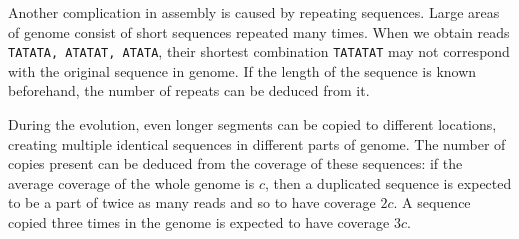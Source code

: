 \medskip

Another complication in assembly is caused by repeating sequences. Large areas of genome consist of short sequences repeated many times.
When we obtain reads \texttt{TATATA, ATATAT, ATATA}, their shortest combination \texttt{TATATAT} may not correspond with the original sequence in genome.
If the length of the sequence is known beforehand, the number of repeats can be deduced from it.

During the evolution, even longer segments can be copied to different locations, 
creating multiple identical sequences in different parts of genome. The number of copies present 
can be deduced from the coverage of these sequences: if the average coverage of the whole genome 
is $c$, then a duplicated sequence is expected to be a part of twice as many reads and so to
have coverage $2c$. A sequence copied three times in the genome is expected to have coverage $3c$.
